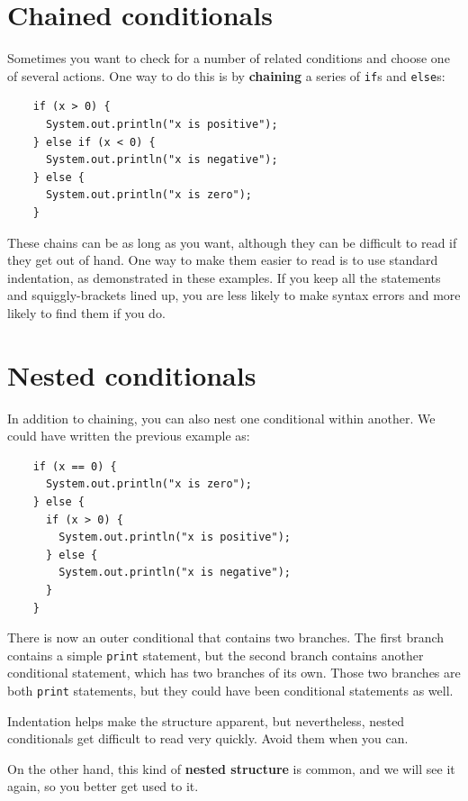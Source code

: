\documentclass[12pt]{book}
\theoremstyle{exercise}
\begin{document}
\section {Chained conditionals}

Sometimes you want to check for a number of related conditions
and choose one of several actions.  One way to do this is by
{\bf chaining} a series of {\tt if}s and {\tt else}s:

\begin{lstlisting}
    if (x > 0) {
      System.out.println("x is positive");
    } else if (x < 0) {
      System.out.println("x is negative");
    } else {
      System.out.println("x is zero");
    }
\end{lstlisting}
%
These chains can be as long as you want, although they can
be difficult to read if they get out of hand.  One way to
make them easier to read is to use standard indentation,
as demonstrated in these examples.  If you keep all the
statements and squiggly-brackets lined up, you are less
likely to make syntax errors and more likely to find them
if you do.


\section{Nested conditionals}

In addition to chaining, you can also nest one conditional
within another.  We could have written the previous example
as:

\begin{lstlisting}
    if (x == 0) {
      System.out.println("x is zero");
    } else {
      if (x > 0) {
        System.out.println("x is positive");
      } else {
        System.out.println("x is negative");
      }
    }
\end{lstlisting}
%
There is now an outer conditional that contains two branches.  The
first branch contains a simple {\tt print} statement, but the second
branch contains another conditional statement, which has two branches
of its own.  Those two branches are both {\tt print}
statements, but they could have been conditional statements as
well.

Indentation helps make the structure
apparent, but nevertheless, nested conditionals get difficult to read
very quickly.  Avoid them when you can.

On the other hand, this kind of {\bf nested structure} is common, and
we will see it again, so you better get used to it.
\end{document}
